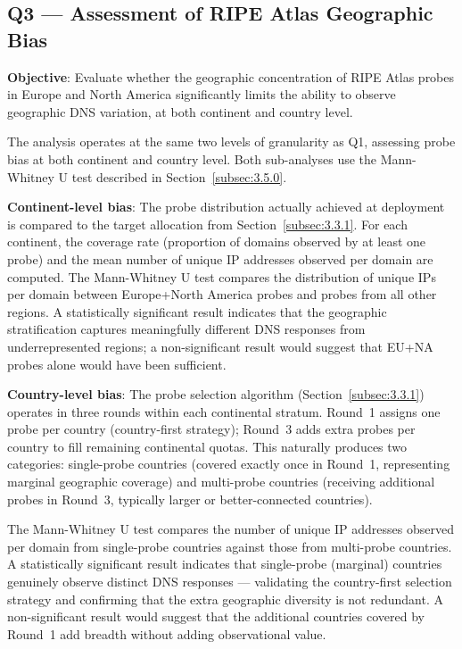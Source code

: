 \subsection{Q3 --- Assessment of RIPE Atlas Geographic Bias}
\label{subsec:3.5.3}

\textbf{Objective}: Evaluate whether the geographic concentration of RIPE Atlas probes in Europe and North America significantly limits the ability to observe geographic \ac{DNS} variation, at both continent and country level.

The analysis operates at the same two levels of granularity as Q1, assessing probe bias at both continent and country level. Both sub-analyses use the Mann-Whitney U test described in Section~\ref{subsec:3.5.0}.

\textbf{Continent-level bias}: The probe distribution actually achieved at deployment is compared to the target allocation from Section~\ref{subsec:3.3.1}. For each continent, the coverage rate (proportion of domains observed by at least one probe) and the mean number of unique \ac{IP} addresses observed per domain are computed. The Mann-Whitney U test compares the distribution of unique \ac{IP}s per domain between Europe+North America probes and probes from all other regions. A statistically significant result indicates that the geographic stratification captures meaningfully different \ac{DNS} responses from underrepresented regions; a non-significant result would suggest that EU+NA probes alone would have been sufficient.

\textbf{Country-level bias}: The probe selection algorithm (Section~\ref{subsec:3.3.1}) operates in three rounds within each continental stratum. Round~1 assigns one probe per country (country-first strategy); Round~3 adds extra probes per country to fill remaining continental quotas. This naturally produces two categories: single-probe countries (covered exactly once in Round~1, representing marginal geographic coverage) and multi-probe countries (receiving additional probes in Round~3, typically larger or better-connected countries).

The Mann-Whitney U test compares the number of unique \ac{IP} addresses observed per domain from single-probe countries against those from multi-probe countries. A statistically significant result indicates that single-probe (marginal) countries genuinely observe distinct \ac{DNS} responses --- validating the country-first selection strategy and confirming that the extra geographic diversity is not redundant. A non-significant result would suggest that the additional countries covered by Round~1 add breadth without adding observational value.

